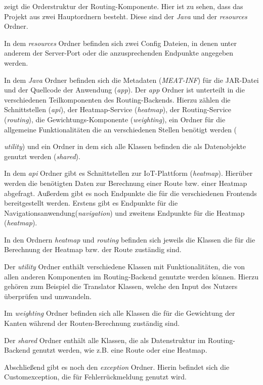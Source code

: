  zeigt die Orderstruktur der Routing-Komponente.
Hier ist zu sehen, dass das Projekt aus zwei Hauptordnern besteht.
Diese sind der \textit{Java} und der \textit{resources} Ordner.

In dem \textit{resources} Ordner befinden sich zwei Config Dateien, in denen unter anderem der Server-Port oder die anzusprechenden Endpunkte angegeben werden.

In dem \textit{Java} Ordner befinden sich die Metadaten (\textit{MEAT-INF}) für die JAR-Datei und der Quellcode der Anwendung (\textit{app}).
Der \textit{app} Ordner ist unterteilt in die verschiedenen Teilkomponenten des Routing-Backends.
Hierzu zählen die Schnittstellen (\textit{api}), der Heatmap-Service (\textit{heatmap}), der Routing-Service (\textit{routing}), die Gewichtungs-Komponente (\textit{weighting}), ein Ordner für die allgemeine Funktionalitäten die an verschiedenen Stellen benötigt werden ({\textit{utility}) und ein Ordner in dem sich alle Klassen befinden die als Datenobjekte genutzt werden (\textit{shared}).

In dem \textit{api} Ordner gibt es Schnittstellen zur IoT-Plattform (\textit{heatmap}).
Hierüber werden die benötigten Daten zur Berechnung einer Route bzw. einer Heatmap abgefragt.
Außerdem gibt es noch Endpunkte die für die verschiedenen Frontends bereitgestellt werden. Erstens gibt es Endpunkte für die Navigationsanwendung(\textit{navigation}) und zweitens Endpunkte für die Heatmap (\textit{heatmap}).

In den Ordnern \textit{heatmap} und \textit{routing} befinden sich jeweils die Klassen die für die Berechnung der Heatmap bzw. der Route zuständig sind.

Der \textit{utility} Ordner enthält verschiedene Klassen mit Funktionalitäten, die von allen anderen Komponenten im Routing-Backend genutzte werden können. 
Hierzu gehören zum Beispiel die Translator Klassen, welche den Input des Nutzers überprüfen und umwandeln. 

Im \textit{weighting} Ordner befinden sich alle Klassen die für die Gewichtung der Kanten während der Routen-Berechnung zuständig sind.

Der \textit{shared} Ordner enthält alle Klassen, die als Datenstruktur im Routing-Backend genutzt werden, wie z.B. eine Route oder eine Heatmap.

Abschließend gibt es noch den \textit{exception} Ordner. 
Hierin befindet sich die Customexception, die für Fehlerrückmeldung genutzt wird.

}
